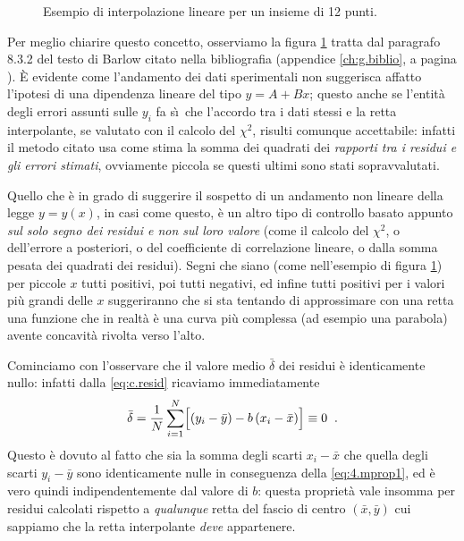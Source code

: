 \begin{figure}[htbp]
  \vspace*{2ex}
  \begin{center}
    
  \end{center}
  \caption{Esempio di interpolazione lineare per un insieme
    di 12 punti.}
  \label{fig:c.intex}
\end{figure}

Per meglio chiarire questo concetto, osserviamo la figura
\ref{fig:c.intex} tratta dal paragrafo 8.3.2 del testo di
Barlow citato nella bibliografia (appendice
\ref{ch:g.biblio}, a pagina \pageref{ch:g.biblio}).  \`E
evidente come l'andamento dei dati sperimentali non
suggerisca affatto l'ipotesi di una dipendenza lineare del
tipo $y=A+Bx$; questo anche se l'entit\`a degli errori
assunti sulle $y_i$ fa s\`\i\ che l'accordo tra i dati
stessi e la retta interpolante, se valutato con il calcolo
del $\chi^2$, risulti comunque accettabile: infatti il
metodo citato usa come stima la somma dei quadrati dei
\emph{rapporti tra i residui e gli errori stimati},
ovviamente piccola se questi ultimi sono stati
sopravvalutati.

Quello che \`e in grado di suggerire il sospetto di un
andamento non lineare della legge $y=y(x)$, in casi come
questo, \`e un altro tipo di controllo basato appunto
\emph{sul solo segno dei residui e non sul loro valore}
(come il calcolo del $\chi^2$, o dell'errore a posteriori, o
del coefficiente di correlazione lineare, o dalla somma
pesata dei quadrati dei residui).  Segni che siano (come
nell'esempio di figura \ref{fig:c.intex}) per piccole $x$
tutti positivi, poi tutti negativi, ed infine tutti positivi
per i valori pi\`u grandi delle $x$ suggeriranno che si sta
tentando di approssimare con una retta una funzione che in
realt\`a \`e una curva pi\`u complessa (ad esempio una
parabola) avente concavit\`a rivolta verso l'alto.

Cominciamo con l'osservare che il valore medio $\bar \delta$
dei residui \`e identicamente nullo: infatti dalla
\eqref{eq:c.resid} ricaviamo immediatamente
\begin{equation*}
  \bar \delta = \frac{1}{N} \sum_{i=1}^N \Bigl[ \left( y_i -
      \bar y \right) - b \left( x_i - \bar x \right) \Bigr]
  \equiv 0 \;\; .
\end{equation*}
Questo \`e dovuto al fatto che sia la somma degli scarti
$x_i - \bar x$ che quella degli scarti $y_i - \bar y$ sono
identicamente nulle in conseguenza della
\eqref{eq:4.mprop1}, ed \`e vero quindi indipendentemente
dal valore di $b$: questa propriet\`a vale insomma per
residui calcolati rispetto a \emph{qualunque} retta del
fascio di centro $(\bar x, \bar y)$ cui sappiamo che la
retta interpolante \emph{deve} appartenere.

